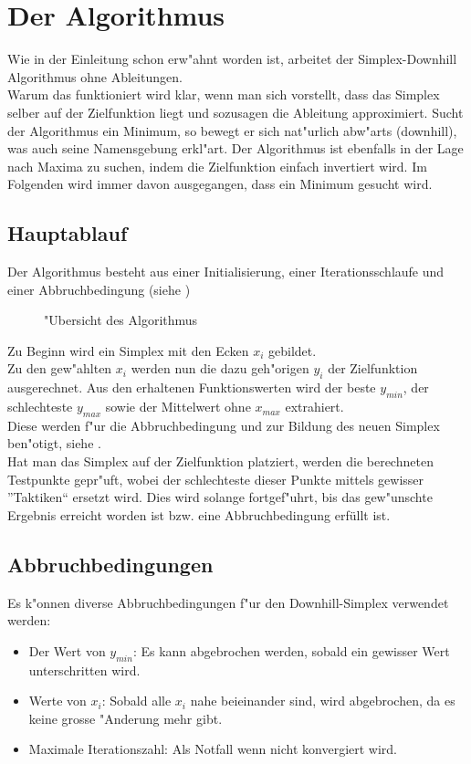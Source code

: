 \section{Der Algorithmus}

Wie in der Einleitung schon erw"ahnt worden ist, arbeitet der Simplex-Downhill Algorithmus ohne Ableitungen.\\
Warum das funktioniert wird klar, wenn man sich vorstellt, dass das Simplex selber auf der Zielfunktion liegt und sozusagen die Ableitung approximiert. Sucht der Algorithmus ein Minimum, so bewegt er sich nat"urlich abw"arts (downhill), was auch seine Namensgebung erkl"art.
Der Algorithmus ist ebenfalls in der Lage nach Maxima zu suchen, indem die Zielfunktion einfach invertiert wird.
Im Folgenden wird immer davon ausgegangen, dass ein Minimum gesucht wird.

\subsection{Hauptablauf}
Der Algorithmus besteht aus einer Initialisierung, einer Iterationsschlaufe und einer Abbruchbedingung (siehe )

\begin{figure}[h]

\caption{"Ubersicht des Algorithmus}
\label{fig:downhillalgo1}
\end{figure}
Zu Beginn wird ein Simplex mit den Ecken $x_i$ gebildet.\\
Zu den gew"ahlten $x_i$ werden nun die dazu geh"origen $y_i$ der Zielfunktion ausgerechnet.
Aus den erhaltenen Funktionswerten wird der beste $y_{min}$, der schlechteste $y_{max}$ sowie der Mittelwert ohne $x_{max}$ extrahiert.\\
Diese werden f"ur die Abbruchbedingung  und zur Bildung des neuen Simplex ben"otigt, siehe .\\
Hat man das Simplex auf der Zielfunktion platziert, werden die berechneten Testpunkte gepr"uft, wobei der schlechteste dieser Punkte mittels gewisser ''Taktiken`` ersetzt wird. Dies wird solange fortgef"uhrt, bis das gew"unschte Ergebnis erreicht worden ist bzw. eine Abbruchbedingung erfüllt ist.

\subsection{Abbruchbedingungen}
\label{sec:downhillAbbruch}
Es k"onnen diverse Abbruchbedingungen f"ur den Downhill-Simplex verwendet werden:
\begin{itemize}
\item Der Wert von $y_{min}$: Es kann abgebrochen werden, sobald ein gewisser Wert unterschritten wird.
\item Werte von $x_i$: Sobald alle $x_i$ nahe beieinander sind, wird abgebrochen, da es keine grosse "Anderung mehr gibt.
\item Maximale Iterationszahl: Als Notfall wenn nicht konvergiert wird.
\end{itemize}

